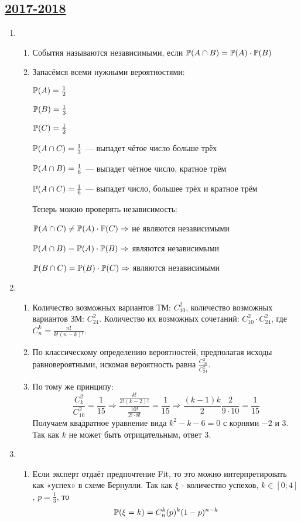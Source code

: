 \subsection[2017-2018]{\hyperref[sec:kr_01_2017_2018]{2017-2018}}
\label{sec:sol_kr_01_2017_2018}

\begin{enumerate}
\item
\begin{enumerate}
\item События называются независимыми, если  $\P(A \cap B) = \P(A) \cdot \P(B)$
\item Запасёмся всеми нужными вероятностями:

$\P(A) = \frac{1}{2}$

$\P(B) = \frac{1}{3}$

$\P(C) = \frac{1}{2}$

$\P(A \cap C) = \frac{1}{3} $ — выпадет чётое число больше трёх

$\P(A \cap B)  = \frac{1}{6}$ — выпадет чётное число, кратное трём

$\P(A \cap C) = \frac{1}{6}$ — выпадет число, большее трёх и кратное трём

Теперь можно проверять независимость:

$\P(A \cap C) \neq \P(A) \cdot \P(C) \Rightarrow$  не являются независимыми

$ \P(A \cap B) = \P(A) \cdot \P(B) \Rightarrow$ являются независимыми

$ \P(B \cap C) = \P(B) \cdot \P(C) \Rightarrow$ являются независимыми

\end{enumerate}
\item
\begin{enumerate}
\item Количество возможных вариантов ТМ: $ C_{10}^2 $,  количество возможных
вариантов ЗМ: $ C_{24}^2 $. Количество их возможных сочетаний: $ C_{10}^2 \cdot C_{24}^2$,
где $ C_n^k = \frac{n!}{k!(n-k)!}$.
\item По классическому определению вероятностей, предполагая исходы равновероятными,
искомая вероятность равна $\frac{C_{16}^2}{C_{24}^2}$.
\item По тому же принципу:
\[
\frac{C_k^2}{C_{10}^2} = \frac{1}{15} \Rightarrow \frac{\frac{k!}{2!(k-2)!}}{\frac{10!}{2! \cdot 8!}} = \frac{1}{15} \Rightarrow \frac{(k-1)k}{2}\frac{ 2}{9 \cdot 10} = \frac{1}{15}
\]
Получаем квадратное уравнение вида $ k^2 - k - 6 = 0 $ с корнями $-2$ и $3$.
Так как $k$ не может быть отрицательным, ответ $3$.
\end{enumerate}
\item
\begin{enumerate}
\item Если эксперт отдаёт предпочтение Fit, то это можно интерпретировать как
«успех» в схеме Бернулли. Так как $\xi$ - количество успехов,
$ k \in [0;4]$, $p = \frac{1}{3} $, то
\[
\P(\xi = k) = C_n^k(p)^k(1-p)^{n-k}
\]


\end{enumerate}
\end{enumerate}
